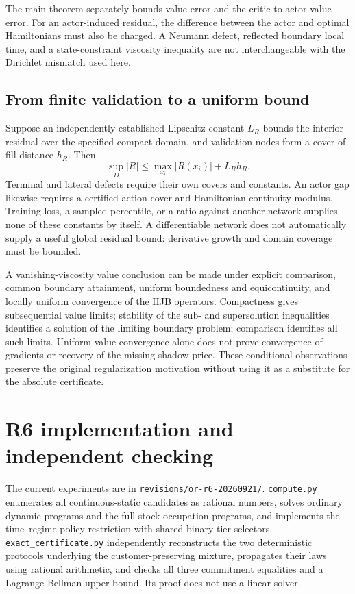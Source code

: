 \documentclass[11pt,letterpaper]{article}
\theoremstyle{definition}
\newcommand{\1}{\mathbf 1}
\begin{document}
The main theorem separately bounds value error and the critic-to-actor value error. For an actor-induced residual, the difference between the actor and optimal Hamiltonians must also be charged. A Neumann defect, reflected boundary local time, and a state-constraint viscosity inequality are not interchangeable with the Dirichlet mismatch used here.

\subsection{From finite validation to a uniform bound}
Suppose an independently established Lipschitz constant $L_R$ bounds the interior residual over the specified compact domain, and validation nodes form a cover of fill distance $h_R$. Then
\[
 \sup_D|R|\leq\max_{x_i}|R(x_i)|+L_Rh_R.
\]
Terminal and lateral defects require their own covers and constants. An actor gap likewise requires a certified action cover and Hamiltonian continuity modulus. Training loss, a sampled percentile, or a ratio against another network supplies none of these constants by itself. A differentiable network does not automatically supply a useful global residual bound: derivative growth and domain coverage must be bounded.

A vanishing-viscosity value conclusion can be made under explicit comparison, common boundary attainment, uniform boundedness and equicontinuity, and locally uniform convergence of the HJB operators. Compactness gives subsequential value limits; stability of the sub- and supersolution inequalities identifies a solution of the limiting boundary problem; comparison identifies all such limits. Uniform value convergence alone does not prove convergence of gradients or recovery of the missing shadow price. These conditional observations preserve the original regularization motivation without using it as a substitute for the absolute certificate.






\clearpage

\clearpage
\section{R6 implementation and independent checking}
The current experiments are in \texttt{revisions/or-r6-20260921/}. \texttt{compute.py} enumerates all continuous-static candidates as rational numbers, solves ordinary dynamic programs and the full-stock occupation programs, and implements the time--regime policy restriction with shared binary tier selectors. \texttt{exact\_certificate.py} independently reconstructs the two deterministic protocols underlying the customer-preserving mixture, propagates their laws using rational arithmetic, and checks all three commitment equalities and a Lagrange Bellman upper bound. Its proof does not use a linear solver.
\end{document}
